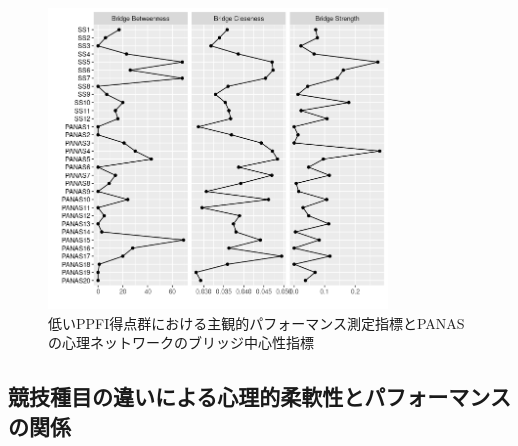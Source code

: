 \documentclass[12pt,a4paper,xelatex,ja=standard]{bxjsarticle}
\begin{document}
\begin{figure}[H]
\centering
\includegraphics[clip,width = 9cm]{figure/Low_B.png}
\caption{低いPPFI得点群における主観的パフォーマンス測定指標とPANASの心理ネットワークのブリッジ中心性指標}
\end{figure}

\hypertarget{ux7af6ux6280ux7a2eux76eeux306eux9055ux3044ux306bux3088ux308bux5fc3ux7406ux7684ux67d4ux8edfux6027ux3068ux30d1ux30d5ux30a9ux30fcux30deux30f3ux30b9ux306eux95a2ux4fc2}{%
\subsection{競技種目の違いによる心理的柔軟性とパフォーマンスの関係}\label{ux7af6ux6280ux7a2eux76eeux306eux9055ux3044ux306bux3088ux308bux5fc3ux7406ux7684ux67d4ux8edfux6027ux3068ux30d1ux30d5ux30a9ux30fcux30deux30f3ux30b9ux306eux95a2ux4fc2}}
\end{document}
